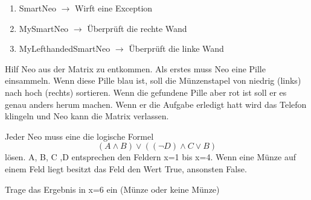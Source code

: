 \begin{questions}
\begin{parts}
        \begin{solution}
            \begin{enumerate}
                \item SmartNeo $\rightarrow{}$ Wirft eine Exception
                \item MySmartNeo $\rightarrow{}$ Überprüft die rechte Wand
                \item MyLefthandedSmartNeo $\rightarrow{}$ Überprüft die linke Wand
            \end{enumerate}
        \end{solution}
\end{parts}

Hilf Neo aus der Matrix zu entkommen. Als erstes muss Neo eine Pille einsammeln. Wenn diese Pille blau ist, soll die Münzenstapel von niedrig (links) nach hoch (rechts) sortieren. Wenn die gefundene Pille aber rot ist soll er es genau anders herum machen.
Wenn er die Aufgabe erledigt hatt wird das Telefon klingeln und Neo kann die Matrix verlassen.

\titledquestion{}
Jeder Neo muss eine die logische Formel
$$
(A \land B) \lor ((\neg D) \land C \lor B)
$$
lösen.
A, B, C ,D entsprechen den Feldern x=1 bis x=4. Wenn eine Münze auf einem Feld liegt besitzt das Feld den Wert True, ansonsten False.

Trage das Ergebnis in x=6 ein (Münze oder keine Münze)
\end{questions}
